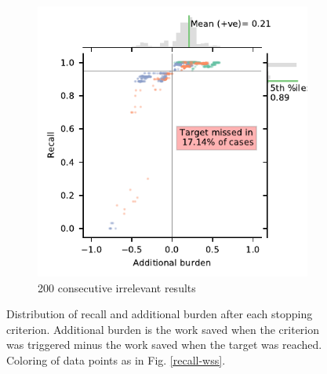 \documentclass{bmcart}
\providecommand{\DIFaddbeginFL}{} %
\providecommand{\DIFaddendFL}{} %
\providecommand{\DIFdelbeginFL}{} %
\providecommand{\DIFdelendFL}{} %
\newcommand{\DIFscaledelfig}{0.5}
\newlength{\DIFdelgraphicswidth} %
\newlength{\DIFdelgraphicsheight} %
\newcommand{\DIFaddincludegraphics}[2][]{{\color{blue}\fbox{\DIFOincludegraphics[#1]{#2}}}} %
\newcommand{\DIFdelincludegraphics}[2][]{%
\sbox{\DIFdelgraphicsbox}{\DIFOincludegraphics[#1]{#2}}%
\settoboxwidth{\DIFdelgraphicswidth}{\DIFdelgraphicsbox} %
\settoboxtotalheight{\DIFdelgraphicsheight}{\DIFdelgraphicsbox} %
\scalebox{\DIFscaledelfig}{%
\parbox[b]{\DIFdelgraphicswidth}{\usebox{\DIFdelgraphicsbox}\\[-\baselineskip] \rule{\DIFdelgraphicswidth}{0em}}\llap{\resizebox{\DIFdelgraphicswidth}{\DIFdelgraphicsheight}{%
\setlength{\unitlength}{\DIFdelgraphicswidth}%
\begin{picture}(1,1)%
\thicklines\linethickness{2pt} %
{\color[rgb]{1,0,0}\put(0,0){\framebox(1,1){}}}%
{\color[rgb]{1,0,0}\put(0,0){\line( 1,1){1}}}%
{\color[rgb]{1,0,0}\put(0,1){\line(1,-1){1}}}%
\end{picture}%
}\hspace*{3pt}}} %
} %
\DeclareRobustCommand{\DIFaddbeginFL}{\DIFOaddbeginFL \let\includegraphics\DIFaddincludegraphics} %
\DeclareRobustCommand{\DIFaddendFL}{\DIFOaddendFL \let\includegraphics\DIFOincludegraphics} %
\DeclareRobustCommand{\DIFdelbeginFL}{\DIFOdelbeginFL \let\includegraphics\DIFdelincludegraphics} %
\DeclareRobustCommand{\DIFdelendFL}{\DIFOaddendFL \let\includegraphics\DIFOincludegraphics} %
\begin{document}
\begin{figure}
\begin{subfigure}[b]{0.475\textwidth}
		\end{subfigure}
		\hfill
		\begin{subfigure}[b]{0.475\textwidth}   
			\centering 
			\DIFdelbeginFL %
\DIFdelendFL \DIFaddbeginFL \includegraphics[width=\textwidth]{2_figs_jointplot_burden_ih_200.pdf}
			\DIFaddendFL \caption[]%
			{{\footnotesize 200 consecutive irrelevant results }}    
			\label{fig:ih_100_ab}
		\end{subfigure}

		\caption{\small Distribution of recall and additional burden after each stopping criterion. Additional burden is the work saved when the criterion was triggered minus the work saved when the target was reached. Coloring of data points as in Fig. \ref{recall-wss}.}
		\label{recall-burden}
	\end{figure}

	
	
\end{document}
